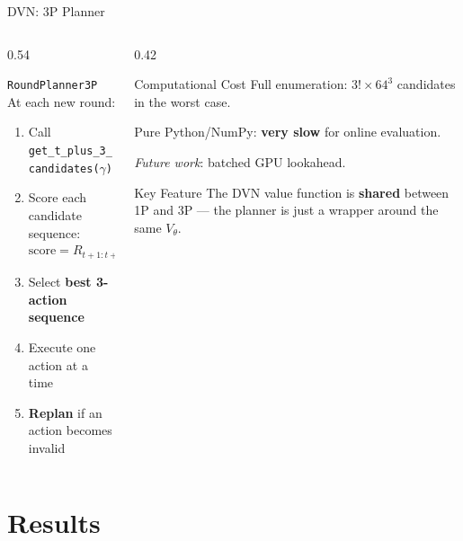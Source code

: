 \documentclass[aspectratio=169,10pt]{beamer}
\begin{document}
\begin{frame}{DVN: 3P Planner}
\begin{columns}[T]
\begin{column}{0.54\textwidth}
\begin{block}{\texttt{RoundPlanner3P}}
At each new round:
\begin{enumerate}
    \item Call \texttt{get\_t\_plus\_3\_candidates($\gamma$)}
    \item Score each candidate sequence:
    \[
    \text{score} = R_{t+1:t+3} + \gamma^3 \cdot V_\theta(s_{t+3})
    \]
    \item Select \textbf{best 3-action sequence}
    \item Execute one action at a time
    \item \textbf{Replan} if an action becomes invalid
\end{enumerate}
\end{block}
\end{column}

\begin{column}{0.42\textwidth}
\begin{alertblock}{Computational Cost}
Full enumeration: $3! \times 64^3$ candidates in the worst case.
\vspace{0.3em}

Pure Python/NumPy: \textbf{very slow} for online evaluation.

\vspace{0.3em}
\textit{Future work}: batched GPU lookahead.
\end{alertblock}

\vspace{0.3em}
\begin{exampleblock}{Key Feature}
The DVN value function is \textbf{shared} between 1P and 3P — the planner is just a wrapper around the same $V_\theta$.
\end{exampleblock}
\end{column}
\end{columns}
\end{frame}

\section{Results}
\end{document}
